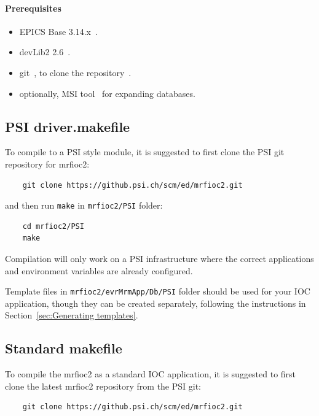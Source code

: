 \documentclass[12pt,a4paper]{article}
\begin{document}
\paragraph{Prerequisites}
\begin{itemize}
\item 
	EPICS Base 3.14.x~\cite{epics}.
\item 
	devLib2 2.6~\cite{devlib2}.
\item
	git~\cite{git}, to clone the repository~\cite{git_mrfioc2}.
\item 
	optionally, MSI tool~\cite{msi} for expanding databases.
\end{itemize}

\subsection{PSI driver.makefile}\label{sec:PSI driver.makefile}
To compile to a PSI style module, it is suggested to first clone the PSI git repository for mrfioc2:
\begin{verbatim}
	git clone https://github.psi.ch/scm/ed/mrfioc2.git
\end{verbatim}
and then run \texttt{make} in \texttt{mrfioc2/PSI} folder:
\begin{verbatim}
	cd mrfioc2/PSI
	make
\end{verbatim}
Compilation will only work on a PSI infrastructure where the correct applications and environment variables are already configured.

Template files in \texttt{mrfioc2/evrMrmApp/Db/PSI} folder should be used for your IOC application, though they can be created separately, following the instructions in Section~\ref{sec:Generating templates}.

\subsection{Standard makefile}\label{sec:Standard makefile}
To compile the mrfioc2 as a standard IOC application, it is suggested to first clone the latest mrfioc2 repository from the PSI git: 
\begin{verbatim}
	git clone https://github.psi.ch/scm/ed/mrfioc2.git
\end{verbatim}
\end{document}
